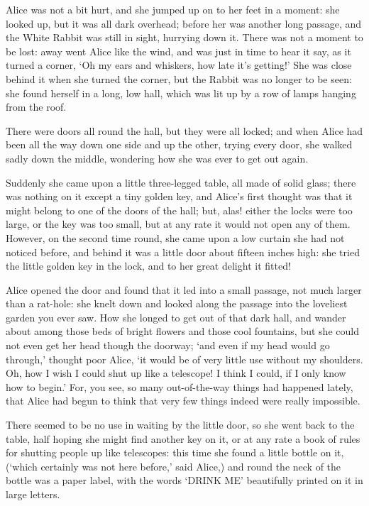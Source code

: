 \documentclass[statementpaper,twoside,openany]{memoir}
\begin{document}
Alice was not a bit hurt, and she jumped up on to her feet in a moment: she looked up, but it was all dark overhead; before her was another long passage, and the White Rabbit was still in sight, hurrying down it. There was not a moment to be lost: away went Alice like the wind, and was just in time to hear it say, as it turned a corner, `Oh my ears and whiskers, how late it's getting!' She was close behind it when she turned the corner, but the Rabbit was no longer to be seen: she found herself in a long, low hall, which was lit up by a row of lamps hanging from the roof.

There were doors all round the hall, but they were all locked; and when Alice had been all the way down one side and up the other, trying every door, she walked sadly down the middle, wondering how she was ever to get out again.

Suddenly she came upon a little three-legged table, all made of solid glass; there was nothing on it except a tiny golden key, and Alice's first thought was that it might belong to one of the doors of the hall; but, alas! either the locks were too large, or the key was too small, but at any rate it would not open any of them. However, on the second time round, she came upon a low curtain she had not noticed before, and behind it was a little door about fifteen inches high: she tried the little golden key in the lock, and to her great delight it fitted!

Alice opened the door and found that it led into a small passage, not much larger than a rat-hole: she knelt down and looked along the passage into the loveliest garden you ever saw. How she longed to get out of that dark hall, and wander about among those beds of bright flowers and those cool fountains, but she could not even get her head though the doorway; `and even if my head would go through,' thought poor Alice, `it would be of very little use without my shoulders. Oh, how I wish I could shut up like a telescope! I think I could, if I only know how to begin.' For, you see, so many out-of-the-way things had happened lately, that Alice had begun to think that very few things indeed were really impossible.

There seemed to be no use in waiting by the little door, so she went back to the table, half hoping she might find another key on it, or at any rate a book of rules for shutting people up like telescopes: this time she found a little bottle on it, (`which certainly was not here before,' said Alice,) and round the neck of the bottle was a paper label, with the words `DRINK ME' beautifully printed on it in large letters.
\end{document}
